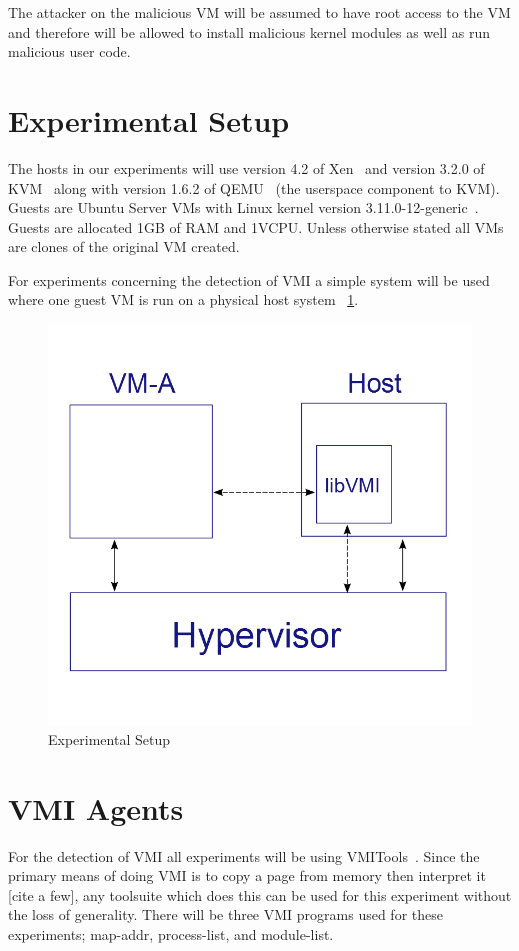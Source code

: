 	The attacker on the malicious VM will be assumed to have root access to the VM and therefore will be allowed to install malicious kernel modules as well as run malicious user code. 

\section{Experimental Setup}\label{Apparatus}

	The hosts in our experiments will use version 4.2 of Xen~\cite{barham_xen_2003} and version 3.2.0 of KVM ~\cite{kivity_kvm:_2007}along with version 1.6.2 of QEMU~\cite{bellard_qemu_2005} (the userspace component to KVM). Guests are Ubuntu Server VMs with Linux kernel version 3.11.0-12-generic~\cite{_Linux_archive}. Guests are allocated 1GB of RAM and 1VCPU. Unless otherwise stated all VMs are clones of the original VM created. 

	For experiments concerning the detection of VMI a simple system will be used where one guest VM is run on a physical host system ~\ref{ExpApp}. 

	\begin{figure}\label{ExpApp}
	  \centering
	  \includegraphics[width=\textwidth]{figures/BM_graph3_cropped.png}
	  \caption{Experimental Setup}
	\end{figure}

\section{VMI Agents}
For the detection of VMI all experiments will be using VMITools~\cite{payne_vmitools_2014}. Since the primary means of doing VMI is to copy a page from memory then interpret it [cite a few], any toolsuite which does this can be used for this experiment without the loss of generality. There will be three VMI programs used for these experiments; map-addr, process-list, and module-list. 

